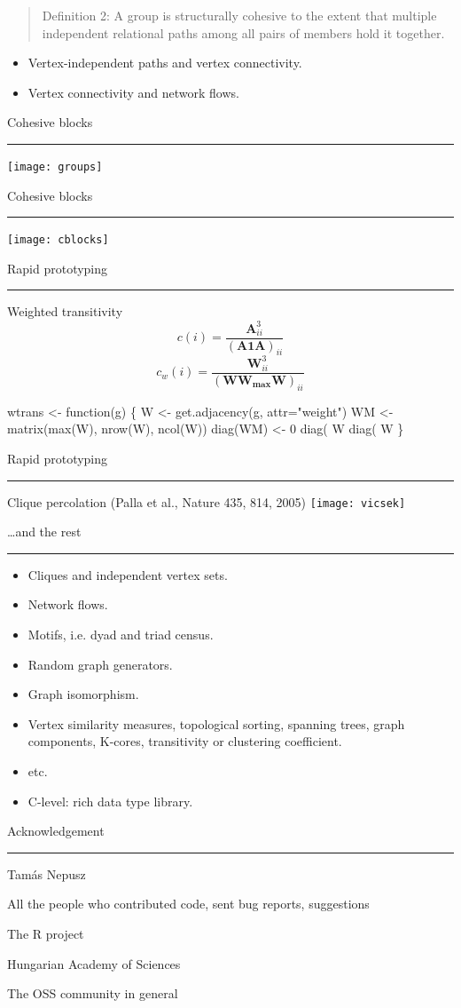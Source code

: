\documentclass[landscape,fleqno]{foils}
\newcommand{\stitle}[1]{{\color{blue}\Large #1\par\vspace*{10pt}\hrule}}
\newcommand{\cstitle}[1]{{\centering\color{blue}\Large #1\par\vspace*{10pt}\hrule}}
\newenvironment{narrow}[2]{%
  \begin{list}{}{%
      \setlength{\topsep}{0pt}%
      \setlength{\leftmargin}{#1}%
      \setlength{\rightmargin}{#2}%
      \setlength{\listparindent}{\parindent}%
      \setlength{\itemindent}{\parindent}%
      \setlength{\parsep}{\parskip}}%
    \item[]}{\end{list}}
\begin{document}
\begin{quotation}
Definition 2: A group is structurally cohesive to the extent that
multiple independent relational paths among all pairs of members hold
it together.
\end{quotation} \pause\vspace*{-0.8cm}

\begin{itemize}
\item Vertex-independent paths and vertex connectivity. \pause\vspace*{-0.8cm}
\item Vertex connectivity and network flows.
\end{itemize}

\newpage
\stitle{Cohesive blocks}
\vspace*{-3cm}
{\centering
\texttt{[image: groups]}\\
}

\newpage
\stitle{Cohesive blocks}
\texttt{[image: cblocks]}\\

\newpage
\stitle{Rapid prototyping}
\begin{narrow}{0cm}{15cm}
Weighted transitivity
\[ c(i)=\frac{\mathbf{A}^3_{ii}}{(\mathbf{A1A})_{ii}} \] \pause
\[ c_w(i)=\frac{\mathbf{W}^3_{ii}}{(\mathbf{WW_{\text{max}}W})_{ii}} \] \pause
\begin{Myverb}
  wtrans <- function(g) \{
    W <- get.adjacency(g, attr="weight")
    WM <- matrix(max(W), nrow(W), ncol(W))
    diag(WM) <- 0
    diag( W %
       diag( W %
  \}
\end{Myverb}
\end{narrow}

\newpage
\stitle{Rapid prototyping}
\begin{narrow}{0cm}{15cm}
Clique percolation (Palla et al., Nature 435, 814, 2005)
\texttt{[image: vicsek]}
\end{narrow}

\newpage
\stitle{\ldots and the rest}
\begin{narrow}{0cm}{15cm}
\begin{itemize}
\item Cliques and independent vertex sets.
\item Network flows.
\item Motifs, i.e. dyad and triad census.
\item Random graph generators.
\item Graph isomorphism.
\item Vertex similarity measures, topological sorting, 
  spanning trees, graph components, K-cores, transitivity or
  clustering coefficient.
\item etc.
\item C-level: rich data type library.
\end{itemize}
\end{narrow}

\newpage
\cstitle{Acknowledgement}

\begin{center}
\vfill
Tam\'as Nepusz\par\vfil
All the people who contributed code, sent bug reports, suggestions\par\vfil
The R project\par\vfil
Hungarian Academy of Sciences\par\vfil
The OSS community in general\par\vfill
\end{center}
\end{document}
